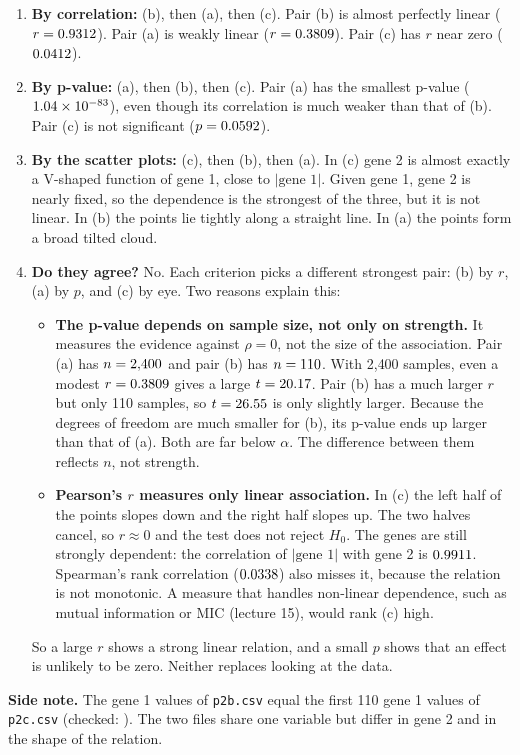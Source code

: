\documentclass[11pt]{article}
\begin{document}
\begin{enumerate}[label=\arabic*.]
  \item \textbf{By correlation:} (b), then (a), then (c).
    Pair (b) is almost perfectly linear ($r = 0.9312$). Pair (a) is weakly linear ($r = 0.3809$). Pair (c) has $r$ near zero ($0.0412$).
  \item \textbf{By p-value:} (a), then (b), then (c).
    Pair (a) has the smallest p-value ($1.04\times 10^{-83}$), even though its correlation is much weaker than that of (b).
    Pair (c) is not significant ($p = 0.0592$).
  \item \textbf{By the scatter plots:} (c), then (b), then (a).
    In (c) gene 2 is almost exactly a V-shaped function of gene 1, close to $|\text{gene 1}|$.
    Given gene 1, gene 2 is nearly fixed, so the dependence is the strongest of the three, but it is not linear.
    In (b) the points lie tightly along a straight line.
    In (a) the points form a broad tilted cloud.
  \item \textbf{Do they agree?} No. Each criterion picks a different strongest pair: (b) by $r$, (a) by $p$, and (c) by eye. Two reasons explain this:
    \begin{itemize}
      \item \textbf{The p-value depends on sample size, not only on strength.}
        It measures the evidence against $\rho = 0$, not the size of the association.
        Pair (a) has $n = 2{,}400$ and pair (b) has $n = 110$.
        With 2{,}400 samples, even a modest $r = 0.3809$ gives a large $t = 20.17$.
        Pair (b) has a much larger $r$ but only 110 samples, so $t = 26.55$ is only slightly larger.
        Because the degrees of freedom are much smaller for (b), its p-value ends up larger than that of (a).
        Both are far below $\alpha$. The difference between them reflects $n$, not strength.
      \item \textbf{Pearson's $r$ measures only linear association.}
        In (c) the left half of the points slopes down and the right half slopes up.
        The two halves cancel, so $r \approx 0$ and the test does not reject $H_0$.
        The genes are still strongly dependent: the correlation of $|\text{gene 1}|$ with gene 2 is $0.9911$.
        Spearman's rank correlation ($0.0338$) also misses it, because the relation is not monotonic.
        A measure that handles non-linear dependence, such as mutual information or MIC (lecture 15), would rank (c) high.
    \end{itemize}
    So a large $r$ shows a strong linear relation, and a small $p$ shows that an effect is unlikely to be zero.
    Neither replaces looking at the data.
\end{enumerate}

\textbf{Side note.} The gene 1 values of \texttt{p2b.csv} equal the first 110 gene 1 values of \texttt{p2c.csv} (checked: \bSharesC).
The two files share one variable but differ in gene 2 and in the shape of the relation.
\end{document}
